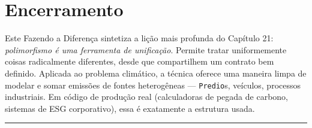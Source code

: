 \documentclass[11pt,a4paper]{article}
\begin{document}
\section*{Encerramento}

Este Fazendo a Diferen\c{c}a sintetiza a li\c{c}\~ao mais profunda do Cap\'itulo 21: \emph{polimorfismo \'e uma ferramenta de unifica\c{c}\~ao}. Permite tratar uniformemente coisas radicalmente diferentes, desde que compartilhem um contrato bem definido. Aplicada ao problema clim\'atico, a t\'ecnica oferece uma maneira limpa de modelar e somar emiss\~oes de fontes heterog\^eneas --- \texttt{Predio}s, ve\'iculos, processos industriais. Em c\'odigo de produ\c{c}\~ao real (calculadoras de pegada de carbono, sistemas de ESG corporativo), essa \'e exatamente a estrutura usada.

\vspace{1em}
\begin{center}\rule{0.5\textwidth}{0.4pt}\end{center}
\end{document}
